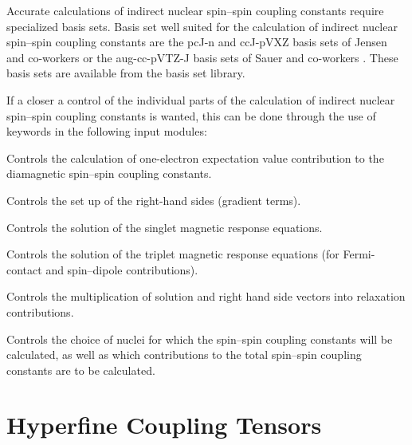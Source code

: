 Accurate calculations of indirect nuclear spin--spin coupling constants
require specialized basis sets. Basis set well suited for the
calculation of indirect nuclear spin--spin coupling constants are the
pcJ-n and ccJ-pVXZ basis sets of Jensen and co-workers
\cite{nmr06-jctc2-1360,bs10-tca126-371,nmr08-jcp129-064111}  or the
aug-cc-pVTZ-J basis sets of Sauer and co-workers
\cite{tejospastcan100,pfpgaaspasjcp115,spas058,spas091,spas096}. These
basis sets are available from the basis set library.


If a closer a control of the individual parts of the calculation of
indirect nuclear spin--spin coupling constants is wanted, this can be
done through the use of keywords in the following input modules:

\begin{list}{}{\itemsep 0.10cm \parsep 0.0cm}
\item[\Sec{EXPECT}] Controls the calculation of one-electron
expectation value contribution to the diamagnetic spin--spin coupling
constants.
\item[\Sec{RHSIDE}] Controls the set up of the right-hand sides
(gradient terms).
\item[\Sec{LINRES}] Controls the solution of the singlet magnetic
response equations.
\item[\Sec{TRPRSP}] Controls the solution of the triplet magnetic
response equations (for Fermi-contact and spin--dipole contributions).
\item[\Sec{RELAX}] Controls the multiplication of solution and right hand
side vectors into relaxation contributions.
\item[\Sec{SPIN-S}] Controls the choice of nuclei for which the
spin--spin coupling constants will be calculated, as well as which
contributions to the total spin--spin coupling constants are to be
calculated.
\end{list}

\section{Hyperfine Coupling Tensors}

